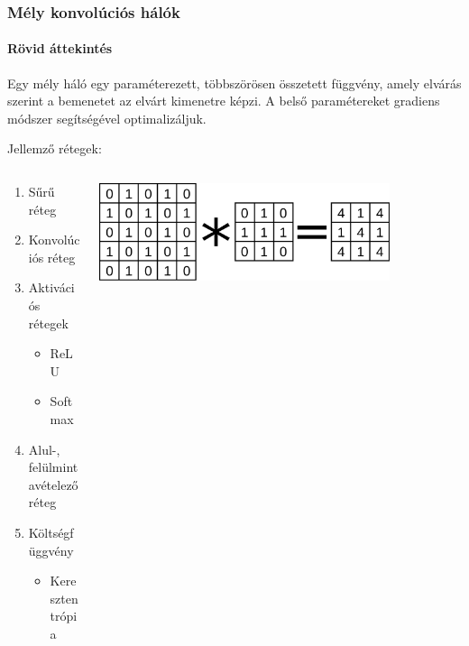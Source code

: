 \documentclass[11pt]{beamer}
\begin{document}
\begin{frame}
	\frametitle{Mély konvolúciós hálók}
	\framesubtitle{Rövid áttekintés}
	
	Egy mély háló egy paraméterezett, többszörösen összetett függvény, amely elvárás szerint a bemenetet az elvárt kimenetre képzi. A belső paramétereket gradiens módszer segítségével optimalizáljuk.
	
	Jellemző rétegek:

	\begin{columns}
		
		\begin{column}{.5\textwidth}
				\begin{enumerate}
				\item
				Sűrű réteg
				\item 
				Konvolúciós réteg
				\item 
				Aktivációs rétegek
				\begin{itemize}
					\item 
					ReLU
					\item
					Softmax
				\end{itemize}
				\item 
				Alul-, felülmintavételező réteg
				\item 
				Költségfüggvény\footnotemark 
				\begin{itemize}
					\item 
					Keresztentrópia
				\end{itemize}
			\end{enumerate}
		\end{column}
		\begin{column}{.5\textwidth}
			\includegraphics[width=0.8\textwidth]{konv-pelda.pdf}
			

\end{column}
\end{columns}
\end{frame}
\end{document}
